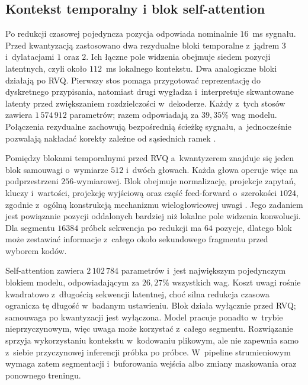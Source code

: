 \subsection{Kontekst temporalny i blok self-attention}
\label{subsec:kontekst-self-attention}

Po redukcji czasowej pojedyncza pozycja odpowiada nominalnie \(16\)~ms sygnału. Przed kwantyzacją zastosowano dwa rezydualne bloki temporalne z~jądrem \(3\) i~dylatacjami \(1\) oraz \(2\). Ich łączne pole widzenia obejmuje siedem pozycji latentnych, czyli około \(112\)~ms lokalnego kontekstu. Dwa analogiczne bloki działają po RVQ. Pierwszy stos pomaga przygotować reprezentację do dyskretnego przypisania, natomiast drugi wygładza i~interpretuje skwantowane latenty przed zwiększaniem rozdzielczości w~dekoderze. Każdy z~tych stosów zawiera \(1\,574\,912\) parametrów; razem odpowiadają za \(39{,}35\%\) wag modelu. Połączenia rezydualne zachowują bezpośrednią ścieżkę sygnału, a~jednocześnie pozwalają nakładać korekty zależne od sąsiednich ramek \cite{He2016DeepResidualLearning}.

Pomiędzy blokami temporalnymi przed RVQ a~kwantyzerem znajduje się jeden blok samouwagi o~wymiarze \(512\) i~dwóch głowach. Każda głowa operuje więc na podprzestrzeni \(256\)-wymiarowej. Blok obejmuje normalizację, projekcje zapytań, kluczy i~wartości, projekcję wyjściową oraz część feed-forward o~szerokości \(1024\), zgodnie z~ogólną konstrukcją mechanizmu wielogłowicowej uwagi \cite{Vaswani2017Attention}. Jego zadaniem jest powiązanie pozycji oddalonych bardziej niż lokalne pole widzenia konwolucji. Dla segmentu \(16384\) próbek sekwencja po redukcji ma \(64\) pozycje, dlatego blok może zestawiać informacje z~całego około sekundowego fragmentu przed wyborem kodów.

Self-attention zawiera \(2\,102\,784\) parametrów i~jest największym pojedynczym blokiem modelu, odpowiadającym za \(26{,}27\%\) wszystkich wag. Koszt uwagi rośnie kwadratowo z~długością sekwencji latentnej, choć silna redukcja czasowa ogranicza tę długość w~badanym ustawieniu. Blok działa wyłącznie przed RVQ; samouwaga po kwantyzacji jest wyłączona. Model pracuje ponadto w~trybie nieprzyczynowym, więc uwaga może korzystać z~całego segmentu. Rozwiązanie sprzyja wykorzystaniu kontekstu w~kodowaniu plikowym, ale nie zapewnia samo z~siebie przyczynowej inferencji próbka po próbce. W~pipeline strumieniowym wymaga zatem segmentacji i~buforowania wejścia albo zmiany maskowania oraz ponownego treningu.

